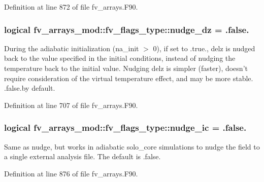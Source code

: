 Definition at line 872 of file fv\-\_\-arrays.\-F90.

\subsubsection[{nudge\-\_\-dz}]{\setlength{\rightskip}{0pt plus 5cm}logical fv\-\_\-arrays\-\_\-mod\-::fv\-\_\-flags\-\_\-type\-::nudge\-\_\-dz = .false.}\label{structfv__arrays__mod_1_1fv__flags__type_a71234b57511aa08b1ddba1ef5c7a9c47}


During the adiabatic initialization (na\-\_\-init $>$ 0), if set to .true., delz is nudged back to the value specified in the initial conditions, instead of nudging the temperature back to the initial value. Nudging delz is simpler (faster), doesn’t require consideration of the virtual temperature effect, and may be more stable. .false.\-by default. 



Definition at line 707 of file fv\-\_\-arrays.\-F90.

\subsubsection[{nudge\-\_\-ic}]{\setlength{\rightskip}{0pt plus 5cm}logical fv\-\_\-arrays\-\_\-mod\-::fv\-\_\-flags\-\_\-type\-::nudge\-\_\-ic = .false.}\label{structfv__arrays__mod_1_1fv__flags__type_abfb0cfc0c4c35db9eace0aec7f7b0986}


Same as nudge, but works in adiabatic solo\-\_\-core simulations to nudge the field to a single external analysis file. The default is .false. 



Definition at line 876 of file fv\-\_\-arrays.\-F90.

